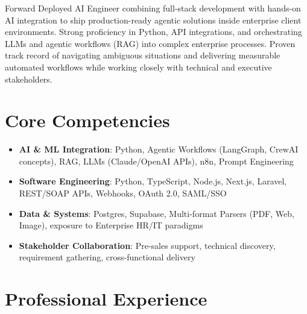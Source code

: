 \documentclass[11pt,a4paper,sans]{moderncv}
\begin{document}
\makecvtitle

Forward Deployed AI Engineer combining full-stack development with hands-on AI integration to ship production-ready agentic solutions inside enterprise client environments. Strong proficiency in Python, API integrations, and orchestrating LLMs and agentic workflows (RAG) into complex enterprise processes. Proven track record of navigating ambiguous situations and delivering measurable automated workflows while working closely with technical and executive stakeholders.

\vspace{3pt}
\section{Core Competencies}
\begin{itemize}
\item \textbf{AI \& ML Integration}: Python, Agentic Workflows (LangGraph, CrewAI concepts), RAG, LLMs (Claude/OpenAI APIs), n8n, Prompt Engineering
\item \textbf{Software Engineering}: Python, TypeScript, Node.js, Next.js, Laravel, REST/SOAP APIs, Webhooks, OAuth 2.0, SAML/SSO
\item \textbf{Data \& Systems}: Postgres, Supabase, Multi-format Parsers (PDF, Web, Image), exposure to Enterprise HR/IT paradigms
\item \textbf{Stakeholder Collaboration}: Pre-sales support, technical discovery, requirement gathering, cross-functional delivery
\end{itemize}

\section{Professional Experience}
\end{document}
